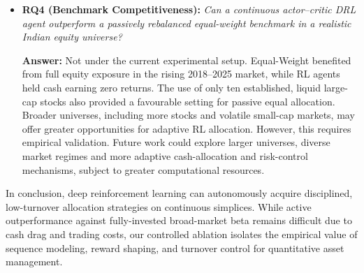 \begin{itemize}
    \item \textbf{RQ4 (Benchmark Competitiveness):} \textit{Can a continuous actor--critic DRL agent outperform a passively rebalanced equal-weight benchmark in a realistic Indian equity universe?}
    
    \textbf{Answer:} Not under the current experimental setup. Equal-Weight benefited from full equity exposure in the rising 2018--2025 market, while RL agents held cash earning zero returns. The use of only ten established, liquid large-cap stocks also provided a favourable setting for passive equal allocation. Broader universes, including more stocks and volatile small-cap markets, may offer greater opportunities for adaptive RL allocation. However, this requires empirical validation. Future work could explore larger universes, diverse market regimes and more adaptive cash-allocation and risk-control mechanisms, subject to greater computational resources.
\end{itemize}

In conclusion, deep reinforcement learning can autonomously acquire disciplined, low-turnover allocation strategies on continuous simplices. While active outperformance against fully-invested broad-market beta remains difficult due to cash drag and trading costs, our controlled ablation isolates the empirical value of sequence modeling, reward shaping, and turnover control for quantitative asset management.
